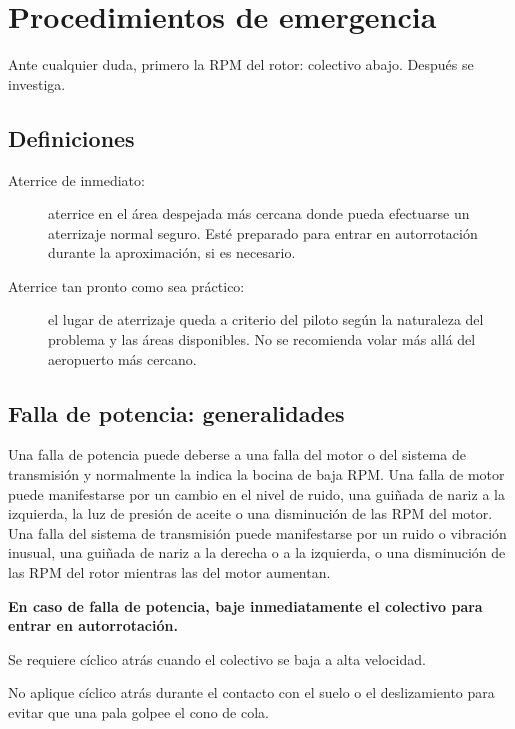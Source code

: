 \chapter{Procedimientos de emergencia}
\label{cap:emergencias}

\opening{Ante cualquier duda, primero la RPM del rotor: colectivo abajo. Después se investiga.}

\section{Definiciones}

\begin{description}
\item[Aterrice de inmediato:] aterrice en el área despejada más cercana donde pueda efectuarse un aterrizaje normal seguro. Esté preparado para entrar en autorrotación durante la aproximación, si es necesario.
\item[Aterrice tan pronto como sea práctico:] el lugar de aterrizaje queda a criterio del piloto según la naturaleza del problema y las áreas disponibles. No se recomienda volar más allá del aeropuerto más cercano.
\end{description}

\section{Falla de potencia: generalidades}

Una falla de potencia puede deberse a una falla del motor o del sistema de transmisión y normalmente la indica la bocina de baja RPM. Una falla de motor puede manifestarse por un cambio en el nivel de ruido, una guiñada de nariz a la izquierda, la luz de presión de aceite o una disminución de las RPM del motor. Una falla del sistema de transmisión puede manifestarse por un ruido o vibración inusual, una guiñada de nariz a la derecha o a la izquierda, o una disminución de las RPM del rotor mientras las del motor aumentan.

\textbf{En caso de falla de potencia, baje inmediatamente el colectivo para entrar en autorrotación.}

\begin{precaucion}
Se requiere cíclico atrás cuando el colectivo se baja a alta velocidad.
\end{precaucion}

\begin{precaucion}
No aplique cíclico atrás durante el contacto con el suelo o el deslizamiento para evitar que una pala golpee el cono de cola.
\end{precaucion}


